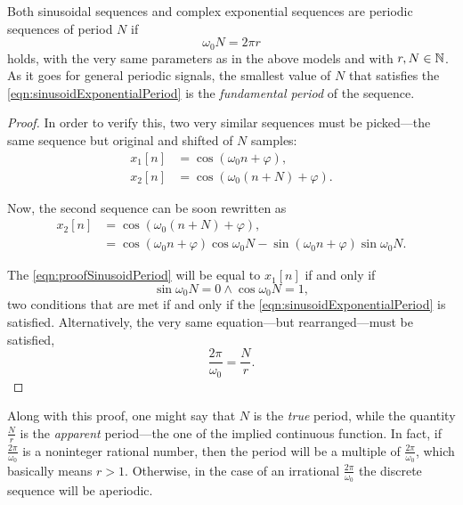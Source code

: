 \documentclass[\documentfontsize, twocolumn]{\classname}
\begin{document}
Both sinusoidal se\-quen\-ces and complex exponential se\-quen\-ces are periodic se\-quen\-ces of period $N$ if 
\begin{equation}\label{eqn:sinusoidExponentialPeriod}
\omega_0 N = 2\pi r
\end{equation}
holds, with the very same parameters as in the above models and with $r,N \in \mathbb N$. As it goes for general periodic signals, the smallest value of $N$ that satisfies the \ref{eqn:sinusoidExponentialPeriod} is the \emph{fundamental period} of the se\-quen\-ce.
\begin{proof}
In order to verify this, two very similar se\-quen\-ces must be picked---the same se\-quen\-ce but original and shifted of $N$ samples:
\begin{align}
    x_1[n] &= \cos{(\omega_0 n + \varphi)},\\
    x_2[n] &= \cos{(\omega_0 (n + N) + \varphi)}.
\end{align}

Now, the second se\-quen\-ce can be soon rewritten as
\begin{align}
    x_2[n] &= \cos{(\omega_0 (n + N) + \varphi)},\\
           &= \cos{(\omega_0 n + \varphi)}\cos{\omega_0 N} - \sin{(\omega_0 n + \varphi)}\sin{\omega_0 N}.\label{eqn:proofSinusoidPeriod}
\end{align}

The \ref{eqn:proofSinusoidPeriod} will be equal to $x_1[n]$ if and only if \begin{equation}\sin{\omega_0 N} = 0 \wedge \cos{\omega_0 N} = 1,\end{equation} two conditions that are met if and only if the \ref{eqn:sinusoidExponentialPeriod} is satisfied. Alternatively, the very same equation---but re\-ar\-ran\-ged---must be satisfied,
\begin{equation}\label{eqn:sinusoidExponentialPeriodFraction}
    \frac{2\pi}{\omega_0} = \frac{N}{r}.
\end{equation}
\end{proof}

Along with this proof, one might say that $N$ is the \emph{true} period, while the quantity $\frac{N}{r}$ is the \emph{apparent} period---the one of the implied continuous function. In fact, if $\frac{2\pi}{\omega_0}$ is a noninteger rational number, then the period will be a multiple of $\frac{2\pi}{\omega_0}$, which basically means $r > 1$. Otherwise, in the case of an irrational $\frac{2\pi}{\omega_0}$ the discrete se\-quen\-ce will be aperiodic.
\end{document}
